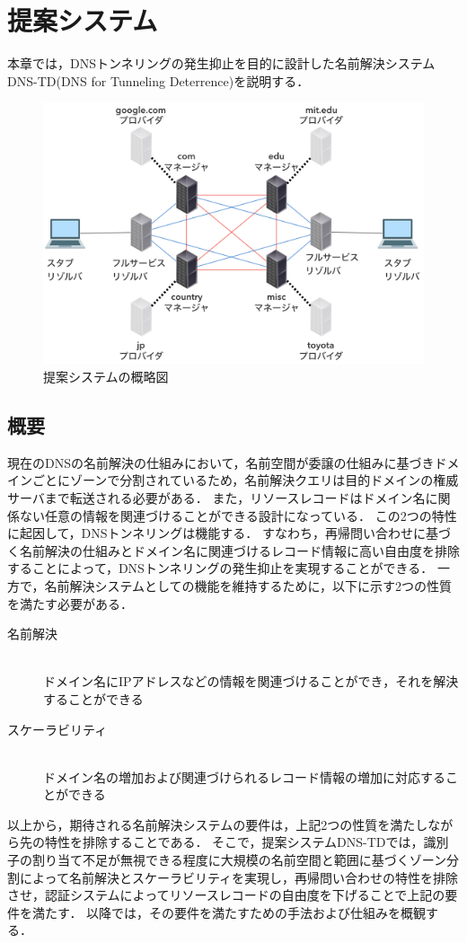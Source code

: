 \section{提案システム}
\label{sec:proposed-system}
本章では，DNSトンネリングの発生抑止を目的に設計した名前解決システムDNS-TD(DNS for Tunneling Deterrence)を説明する．
\begin{figure}[h]
 \centering
 \label{fig:abstruct-DNS-TD-architecture}
 \includegraphics[scale=0.6]{figure/new-architecture-DNS-TD.png}
 \caption{提案システムの概略図}
\end{figure}
\subsection{概要}
\label{sec:DNS-TD}
現在のDNSの名前解決の仕組みにおいて，名前空間が委譲の仕組みに基づきドメインごとにゾーンで分割されているため，名前解決クエリは目的ドメインの権威サーバまで転送される必要がある．
また，リソースレコードはドメイン名に関係ない任意の情報を関連づけることができる設計になっている．
この2つの特性に起因して，DNSトンネリングは機能する．
すなわち，再帰問い合わせに基づく名前解決の仕組みとドメイン名に関連づけるレコード情報に高い自由度を排除することによって，DNSトンネリングの発生抑止を実現することができる．
一方で，名前解決システムとしての機能を維持するために，以下に示す2つの性質を満たす必要がある．
\begin{description}
 \item[名前解決]\mbox{}\\ ドメイン名にIPアドレスなどの情報を関連づけることができ，それを解決することができる
 \item[スケーラビリティ]\mbox{}\\ ドメイン名の増加および関連づけられるレコード情報の増加に対応することができる
\end{description}
以上から，期待される名前解決システムの要件は，上記2つの性質を満たしながら先の特性を排除することである．
そこで，提案システムDNS-TDでは，識別子の割り当て不足が無視できる程度に大規模の名前空間と範囲に基づくゾーン分割によって名前解決とスケーラビリティを実現し，再帰問い合わせの特性を排除させ，認証システムによってリソースレコードの自由度を下げることで上記の要件を満たす．
以降では，その要件を満たすための手法および仕組みを概観する．\newline


